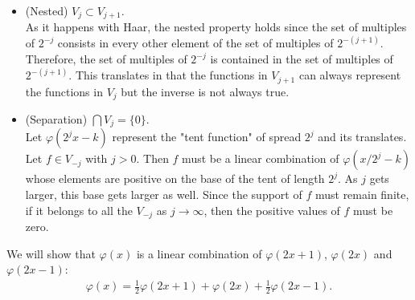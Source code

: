 \begin{questions}

\begin{solution}
\begin{itemize}
\item (Nested) $V_j\subset V_{j+1}$.\\
As it happens with Haar, the nested property holds since the set of multiples of $2^{-j}$ consists in every other element of the set of multiples of $2^{-(j+1)}$. Therefore, the set of multiples of $2^{-j}$ is contained in the set of multiples of $2^{-(j+1)}$. This translates in that the functions in $V_{j+1}$ can always represent the functions in $V_j$ but the inverse is not always true.
\item (Separation) $\bigcap V_j=\{0\}$.\\
Let $\varphi(2^jx-k)$ represent the "tent function" of spread $2^j$ and its translates. Let $f\in V_{-j}$ with $j>0$. Then $f$ must be a linear combination of $\varphi(x/2^j-k)$ whose elements are positive on the base of the tent of length $2^{j}$. As $j$ gets larger, this base gets larger as well. Since the support of $f$ must remain finite, if it belongs to all the $V_{-j}$ as $j\rightarrow\infty$, then the positive values of $f$ must be zero.
\end{itemize}
\end{solution}
\begin{solution}
We will show that $\varphi(x)$ is a linear combination of $\varphi(2x+1)$, $\varphi(2x)$ and $\varphi(2x-1)$:
\begin{align*}
\varphi(x)=\frac{1}{2}\varphi(2x+1)+\varphi(2x)+\frac{1}{2}\varphi(2x-1).
\end{align*}

\end{solution}
\end{questions}
